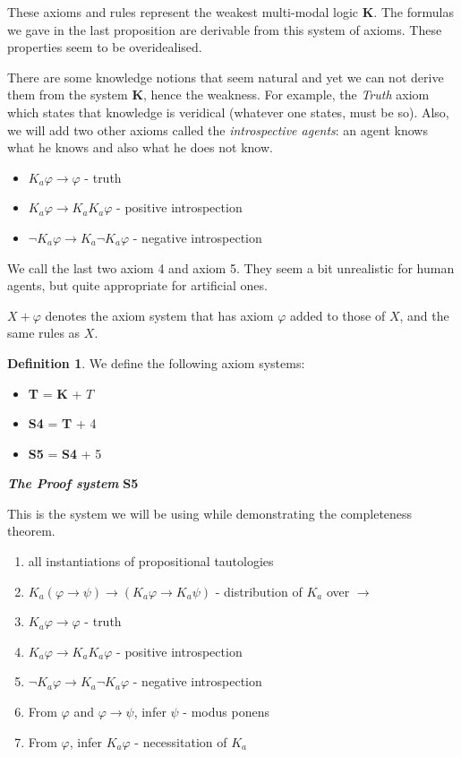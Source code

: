 \documentclass[12pt]{article}
\numberwithin{equation}{section}
\theoremstyle{definition}
\theoremstyle{definition}
\newtheorem{defn}[thm]{Definition}
\theoremstyle{remark}
\begin{document}
These axioms and rules represent the weakest multi-modal logic \textbf{K}. The formulas we gave in the last proposition are derivable from this system of axioms. These properties seem to be overidealised.

There are some knowledge notions that seem natural and yet we can not derive them from the system \textbf{K}, hence the weakness. For example, the \textit{Truth} axiom which states that knowledge is veridical (whatever one states, must be so). Also, we will add two other axioms called the \textit{introspective agents}: 
an agent knows what he knows and also what he does not know.
\begin{itemize}
    \item $K_a\varphi\rightarrow\varphi$  -  truth
    \item $K_a\varphi\rightarrow K_a K_a\varphi$ -  positive introspection
    \item $\neg K_a\varphi\rightarrow K_a\neg K_a\varphi$  -  negative introspection
\end{itemize}

We call the last two axiom 4 and axiom 5. They seem a bit unrealistic for human agents, but quite appropriate for artificial ones.

$X + \varphi$ denotes the axiom system that has axiom $\varphi$ added to those of $X$, and the same rules as $X$.

\begin{defn}

We define the following axiom systems:
\begin{itemize}
\item \textbf{T} = \textbf{K} + $T$
\item \textbf{S4} = \textbf{T} + 4
\item \textbf{S5} = \textbf{S4} + 5
\end{itemize}

\end{defn}

\textit{\textbf{The Proof system}} \textbf{S5}

This is the system we will be using while demonstrating the completeness theorem.

\begin{enumerate}
\item all instantiations of propositional tautologies 
\item $K_a (\varphi \rightarrow \psi) \rightarrow (K_a\varphi \rightarrow K_a\psi)$  -  distribution of $K_a$ over $\rightarrow$
\item $K_a\varphi \rightarrow \varphi$  -  truth 
\item $K_a\varphi \rightarrow K_a K_a \varphi$  -  positive introspection
\item $\neg K_a\varphi \rightarrow K_a\neg K_a\varphi$  -  negative introspection
\item From $\varphi$ and $\varphi \rightarrow \psi$, infer $\psi$  -  modus ponens
\item From $\varphi$, infer $K_a\varphi$  -  necessitation of $K_a$

\end{enumerate}
\end{document}
